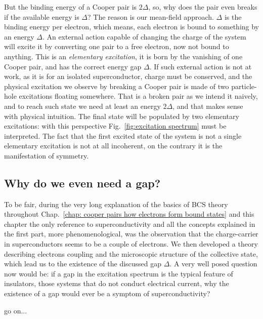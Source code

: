 But the binding energy of a Cooper pair is $2\Delta$, so, why does the pair even breaks if the available energy is $\Delta$? The reason is our mean-field approach. $\Delta$ is the binding energy per electron, which means, each electron is bound to something by an energy $\Delta$. An external action capable of changing the charge of the system will excite it by converting one pair to a free electron, now not bound to anything. This is an \textit{elementary excitation}, it is born by the vanishing of one Cooper pair, and has the correct energy gap $\Delta$. If such external action is not at work, as it is for an isolated superconductor, charge must be conserved, and the physical excitation we observe by breaking a Cooper pair is made of two particle-hole excitations floating somewhere. That is a broken pair as we intend it naively, and to reach such state we need at least an energy $2\Delta$, and that makes sense with physical intuition. The final state will be populated by two elementary excitations: with this perspective Fig.~\ref{fig:excitation spectrum} must be interpreted. The fact that the first excited state of the system is not a single elementary excitation is not at all incoherent, on the contrary it is the manifestation of symmetry.

\subsection{Why do we even need a gap?}

To be fair, during the very long explanation of the basics of BCS theory throughout Chap.~\ref{chap: cooper pairs how electrons form bound states} and this chapter the only reference to superconductivity and all the concepts explained in the first part, more phenomenological, was the observation that the charge-carrier in superconductors seems to be a couple of electrons. We then developed a theory describing electrons coupling and the microscopic structure of the collective state, which lead us to the existence of the discussed gap $\Delta$. A very well posed question now would be: if a gap in the excitation spectrum is the typical feature of insulators, those systems that do not conduct electrical current, why the existence of a gap would ever be a symptom of superconductivity?

{\color{red}go on...}